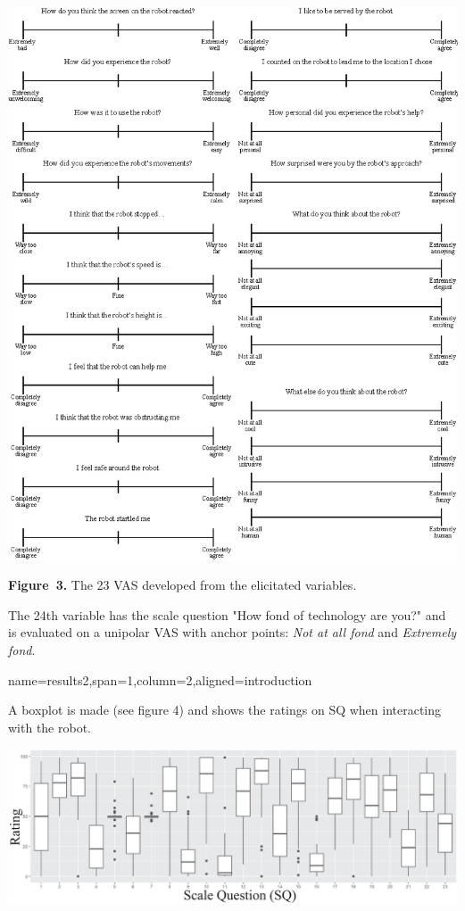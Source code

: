 \documentclass[paperwidth=118cm,paperheight=84cm,landscape,fontscale=0.2941]{baposter}
\begin{document}
\begin{poster}
{\vspace{-15pt}
\begin{center}
	\includegraphics[width=1.0\linewidth]{AllScalesSpace.eps}

\textbf{Figure~3. }The 23 VAS developed from the elicitated variables.
\end{center}
\vspace{-15pt}

The 24th variable has the scale question "How fond of technology are you?" and is evaluated on a unipolar VAS with anchor points: \textit{Not at all fond} and \textit{Extremely fond}.
}



{name=results2,span=1,column=2,aligned=introduction}
{\parskip 5pt
A boxplot is made (see figure 4) and shows the ratings on SQ when interacting with the robot. 
\begin{center}

\vspace{-10pt}
	\includegraphics[width=0.9\linewidth]{Boksplot0er.eps}


\end{center}}
\end{poster}
\end{document}
